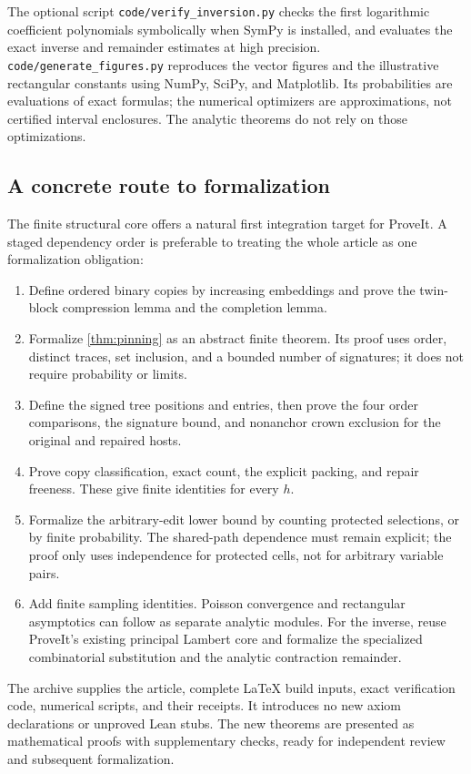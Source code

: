 The optional script \texttt{code/verify\_inversion.py} checks the
first logarithmic coefficient polynomials symbolically when SymPy is
installed, and evaluates
the exact inverse and remainder estimates at high precision.
\texttt{code/generate\_figures.py} reproduces the vector figures and
the illustrative rectangular constants using NumPy, SciPy, and
Matplotlib. Its probabilities are evaluations of exact formulas;
the numerical optimizers are approximations, not certified interval
enclosures. The analytic theorems do not rely on those optimizations.

\subsection{A concrete route to formalization}

The finite structural core offers a natural first integration target
for ProveIt. A staged dependency order is preferable to treating
the whole article as one formalization obligation:
\begin{enumerate}
\item Define ordered binary copies by increasing embeddings and prove
the twin-block compression lemma and the completion lemma.
\item Formalize \cref{thm:pinning} as an abstract finite theorem.
Its proof uses order, distinct traces, set inclusion, and a bounded
number of signatures; it does not require probability or limits.
\item Define the signed tree positions and entries, then prove the
four order comparisons, the signature bound, and nonanchor crown
exclusion for the original and repaired hosts.
\item Prove copy classification, exact count, the explicit packing,
and repair freeness. These give finite identities for every \(h\).
\item Formalize the arbitrary-edit lower bound by counting protected
selections, or by finite probability. The shared-path dependence
must remain explicit; the proof only uses independence for protected
cells, not for arbitrary variable pairs.
\item Add finite sampling identities. Poisson convergence and
rectangular asymptotics can follow as separate analytic modules.
For the inverse, reuse ProveIt's existing principal Lambert core
and formalize the specialized combinatorial substitution and the
analytic contraction remainder.
\end{enumerate}

The archive supplies the article, complete LaTeX build inputs, exact
verification code, numerical scripts, and their receipts. It introduces
no new axiom declarations or unproved Lean stubs. The new theorems are
presented as mathematical proofs with supplementary checks, ready for
independent review and subsequent formalization.

